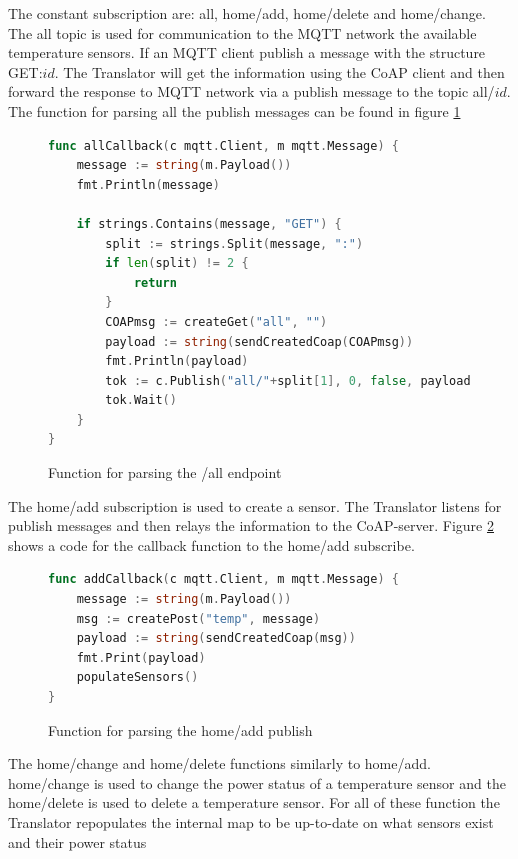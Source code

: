 The constant subscription are: all, home/add, home/delete and home/change. The all topic is used for communication to the MQTT network the available temperature sensors. If an MQTT client publish a message with the structure GET:$id$. The Translator will get the information using the CoAP client and then forward the response to MQTT network via a publish message to the topic all/$id$. The function for parsing all the publish messages can be found in figure \ref{code:translator:all}

\begin{figure}[H]
    \begin{lstlisting}[language=go]
func allCallback(c mqtt.Client, m mqtt.Message) {
    message := string(m.Payload())
    fmt.Println(message)

    if strings.Contains(message, "GET") {
        split := strings.Split(message, ":")
        if len(split) != 2 {
            return
        }
        COAPmsg := createGet("all", "")
        payload := string(sendCreatedCoap(COAPmsg))
        fmt.Println(payload)
        tok := c.Publish("all/"+split[1], 0, false, payload)
        tok.Wait()
    }
}
\end{lstlisting}
    \caption{Function for parsing the /all endpoint}
    \label{code:translator:all}
\end{figure}

The home/add subscription is used to create a sensor. The Translator listens for publish messages and then relays the information to the CoAP-server. Figure \ref{code:translator:add} shows a code for the callback function to the home/add subscribe.

\begin{figure}[H]
    \begin{lstlisting}[language=go]
func addCallback(c mqtt.Client, m mqtt.Message) {
	message := string(m.Payload())
	msg := createPost("temp", message)
	payload := string(sendCreatedCoap(msg))
	fmt.Print(payload)
	populateSensors()
}
\end{lstlisting}
    \caption{Function for parsing the home/add publish}
    \label{code:translator:add}
\end{figure}

The home/change and home/delete functions similarly to home/add. home/change is used to change the power status of a temperature sensor and the home/delete is used to delete a temperature sensor. For all of these function the Translator repopulates the internal map to be up-to-date on what sensors exist and their power status

